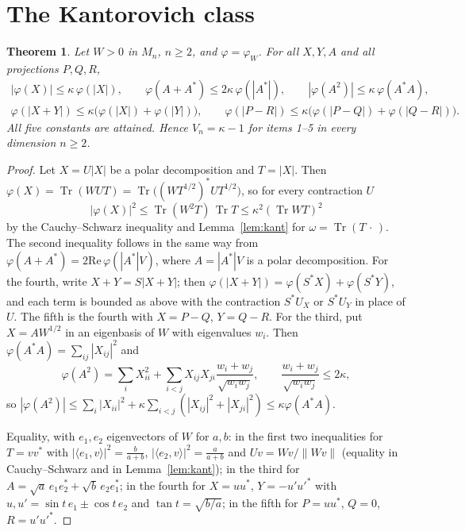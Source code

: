 \documentclass[11pt]{article}
\DeclareMathOperator{\Tr}{Tr}
\renewcommand{\Re}{\mathrm{Re}\,}
\theoremstyle{plain}
\newtheorem{theorem}{Theorem}[section]
\theoremstyle{definition}
\theoremstyle{remark}
\begin{document}
\section{The Kantorovich class}\label{sec:kant}

\begin{theorem}\label{thm:kant}
Let $W>0$ in $M_n$, $n\ge2$, and $\varphi=\varphi_W$. For all $X,Y,A$ and all projections $P,Q,R$,
\begin{gather*}
|\varphi(X)|\le\kappa\,\varphi(|X|),\qquad \varphi(A+A^*)\le2\kappa\,\varphi(|A^*|),\qquad |\varphi(A^2)|\le\kappa\,\varphi(A^*A),\\
\varphi(|X+Y|)\le\kappa\bigl(\varphi(|X|)+\varphi(|Y|)\bigr),\qquad
\varphi(|P-R|)\le\kappa\bigl(\varphi(|P-Q|)+\varphi(|Q-R|)\bigr).
\end{gather*}
All five constants are attained. Hence $V_n=\kappa-1$ for items 1--5 in every dimension $n\ge2$.
\end{theorem}
\begin{proof}
Let $X=U|X|$ be a polar decomposition and $T=|X|$. Then $\varphi(X)=\Tr(WUT)=\Tr\bigl((WT^{1/2})^*UT^{1/2}\bigr)$, so for every contraction $U$
\[
  |\varphi(X)|^2\le\Tr(W^2T)\,\Tr T\le\kappa^2(\Tr WT)^2
\]
by the Cauchy--Schwarz inequality and Lemma~\ref{lem:kant} for $\omega=\Tr(T\,\cdot\,)$. The second inequality follows in the same way from
$\varphi(A+A^*)=2\Re\varphi(|A^*|V)$, where $A=|A^*|V$ is a polar decomposition. For the fourth, write $X+Y=S|X+Y|$; then $\varphi(|X+Y|)=\varphi(S^*X)+\varphi(S^*Y)$, and each term
is bounded as above with the contraction $S^*U_X$ or $S^*U_Y$ in place of $U$. The fifth is the fourth with $X=P-Q$,
$Y=Q-R$. For the third, put $X=AW^{1/2}$ in an eigenbasis of $W$ with eigenvalues $w_i$. Then $\varphi(A^*A)=\sum_{ij}|X_{ij}|^2$ and
\[
  \varphi(A^2)=\sum_iX_{ii}^2+\sum_{i<j}X_{ij}X_{ji}\frac{w_i+w_j}{\sqrt{w_iw_j}},\qquad\frac{w_i+w_j}{\sqrt{w_iw_j}}\le2\kappa,
\]
so $|\varphi(A^2)|\le\sum_i|X_{ii}|^2+\kappa\sum_{i<j}(|X_{ij}|^2+|X_{ji}|^2)\le\kappa\varphi(A^*A)$.

Equality, with $e_1,e_2$ eigenvectors of $W$ for $a,b$: in the first two inequalities for $T=vv^*$ with
$|\langle e_1,v\rangle|^2=\frac b{a+b}$, $|\langle e_2,v\rangle|^2=\frac a{a+b}$ and $Uv=Wv/\|Wv\|$ (equality in
Cauchy--Schwarz and in Lemma~\ref{lem:kant}); in the third for $A=\sqrt a\,e_1e_2^*+\sqrt b\,e_2e_1^*$; in the fourth for
$X=uu^*$, $Y=-u'u'^*$ with $u,u'=\sin t\,e_1\pm\cos t\,e_2$ and $\tan t=\sqrt{b/a}$; in the fifth for $P=uu^*$, $Q=0$,
$R=u'u'^*$.
\end{proof}
\end{document}
